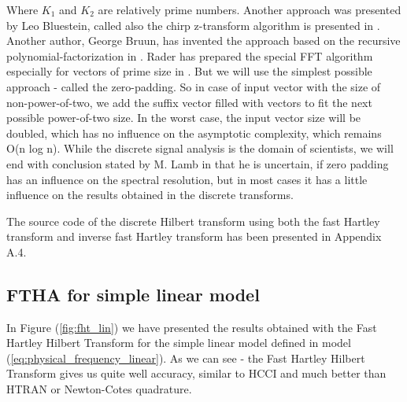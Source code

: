 \documentclass[12pt,twoside,a4paper]{article}
\numberwithin{equation}{subsection}
\numberwithin{figure}{subsection}
\begin{document}
Where $K_1$ and $K_2$ are relatively prime numbers. Another approach was presented by Leo Bluestein, called also the chirp
z-transform algorithm is presented in \cite{bluestein_linear}. Another author, George Bruun, has invented the approach based on
the recursive polynomial-factorization in \cite{bruun_ztransform}. Rader has prepared the special FFT algorithm especially for
vectors of prime size in \cite{rader_dicrete}. But we will use the simplest possible approach - called the zero-padding. So in case
of input vector with the size of non-power-of-two, we add the suffix vector filled with vectors to fit the next possible
power-of-two size. In the worst case, the input vector size will be doubled, which has no influence on the asymptotic complexity,
which remains O(n log n). While the discrete signal analysis is the domain of scientists, we will end with conclusion stated by M.
Lamb in \cite{lamb_issues} that he is uncertain, if zero padding has an influence on the spectral resolution, but in most cases it
has a little influence on the results obtained in the discrete transforms.

The source code of the discrete Hilbert transform using both the fast Hartley transform and inverse fast Hartley transform has been
presented in Appendix A.4.

\subsection{FTHA for simple linear model} \label{chap:hartley_lin}

In Figure (\ref{fig:fht_lin}) we have presented the results obtained with the Fast Hartley Hilbert Transform for the simple
linear model defined in model (\ref{eq:physical_frequency_linear}). As we can see - the Fast Hartley Hilbert Transform gives us quite well
accuracy, similar to HCCI and much better than HTRAN or Newton-Cotes quadrature. 
\end{document}
